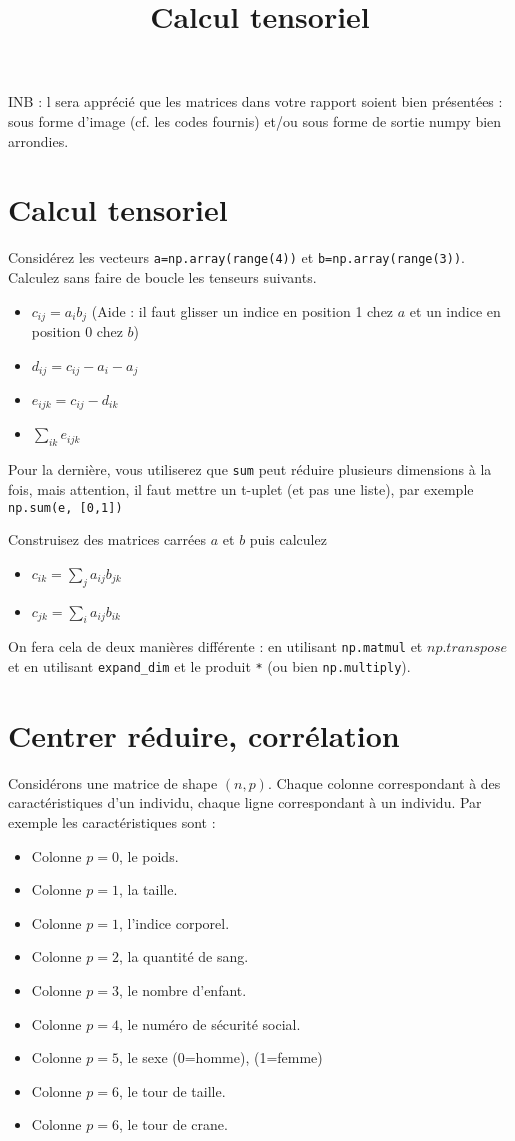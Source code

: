\documentclass{article}
\title{Calcul tensoriel}
\begin{document}
\maketitle

INB : l sera apprécié que les matrices dans votre rapport soient bien présentées : sous forme d'image (cf. les codes fournis) et/ou sous forme de sortie numpy bien arrondies.

\section{Calcul tensoriel}


Considérez les vecteurs \verb$a=np.array(range(4))$ et \verb$b=np.array(range(3))$. Calculez sans faire de boucle les tenseurs suivants.  
\begin{itemize}
\item $c_{ij} = a_i b_j $ (Aide : il faut glisser un indice en position 1 chez $a$ et un indice en position 0 chez $b$)
\item $d_{ij}  = c_{ij} -a_i - a_j $
\item $e_{ijk} = c_{ij} - d_{ik} $
\item $\sum_{ik} e_{ijk}$
\end{itemize}
Pour la dernière, vous utiliserez que \verb$sum$ peut réduire plusieurs dimensions à la fois, mais attention, il faut mettre un t-uplet (et pas une liste), par exemple \verb$np.sum(e, [0,1])$


Construisez des matrices carrées $a$ et $b$ puis calculez 
\begin{itemize}
\item $c_{ik}= \sum_j a_{ij} b_{jk}$
\item $ c_{jk} = \sum_i a_{ij} b_{ik}$ 
\end{itemize}
On fera cela de deux manières différente : en utilisant \verb$np.matmul$ et $np.transpose$ et en utilisant \verb$expand_dim$ et le produit \verb$*$  (ou bien \verb$np.multiply$). 


\section{Centrer réduire, corrélation}


Considérons une matrice de shape $(n,p)$.  Chaque colonne correspondant à des caractéristiques d'un individu, chaque ligne correspondant à un individu. Par exemple les caractéristiques sont : 
\begin{itemize}
\item Colonne $p=0$, le poids. 
\item Colonne $p=1$, la taille. 
\item Colonne $p=1$, l'indice corporel. 
\item Colonne $p=2$, la quantité de sang.  
\item Colonne $p=3$, le nombre d'enfant. 
\item Colonne $p=4$, le numéro de sécurité social. 
\item Colonne $p=5$, le sexe (0=homme), (1=femme)
\item Colonne $p=6$, le tour de taille.
\item Colonne $p=6$, le tour de crane.
\end{itemize}
\end{document}
